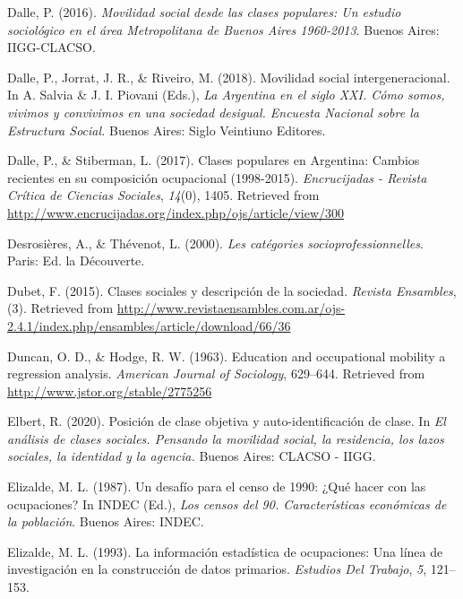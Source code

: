 \documentclass[
]{article}
\newlength{\cslhangindent}
\newlength{\cslentryspacingunit} %
\newenvironment{CSLReferences}[2] %
 {%
  \setlength{\parindent}{0pt}
  \ifodd #1
  \let\oldpar\par
  \def\par{\hangindent=\cslhangindent\oldpar}
  \fi
  \setlength{\parskip}{#2\cslentryspacingunit}
 }%
 {}
\begin{document}
\begin{CSLReferences}{1}{0}
\leavevmode{}%
Dalle, P. (2016). \emph{Movilidad social desde las clases populares: Un estudio sociológico en el área {Metropolitana} de {Buenos} {Aires} 1960-2013}. Buenos Aires: IIGG-CLACSO.

\leavevmode{}%
Dalle, P., Jorrat, J. R., \& Riveiro, M. (2018). Movilidad social intergeneracional. In A. Salvia \& J. I. Piovani (Eds.), \emph{La {Argentina} en el siglo {XXI}. {Cómo} somos, vivimos y convivimos en una sociedad desigual. {Encuesta} {Nacional} sobre la {Estructura} {Social}.} Buenos Aires: Siglo Veintiuno Editores.

\leavevmode{}%
Dalle, P., \& Stiberman, L. (2017). Clases populares en {Argentina}: Cambios recientes en su composición ocupacional (1998-2015). \emph{Encrucijadas - Revista Crítica de Ciencias Sociales}, \emph{14}(0), 1405. Retrieved from \url{http://www.encrucijadas.org/index.php/ojs/article/view/300}

\leavevmode{}%
Desrosières, A., \& Thévenot, L. (2000). \emph{Les catégories socioprofessionnelles}. Paris: Ed. la Découverte.

\leavevmode{}%
Dubet, F. (2015). Clases sociales y descripción de la sociedad. \emph{Revista Ensambles}, (3). Retrieved from \url{http://www.revistaensambles.com.ar/ojs-2.4.1/index.php/ensambles/article/download/66/36}

\leavevmode{}%
Duncan, O. D., \& Hodge, R. W. (1963). Education and occupational mobility a regression analysis. \emph{American Journal of Sociology}, 629--644. Retrieved from \url{http://www.jstor.org/stable/2775256}

\leavevmode{}%
Elbert, R. (2020). Posición de clase objetiva y auto-identificación de clase. In \emph{El análisis de clases sociales. {Pensando} la movilidad social, la residencia, los lazos sociales, la identidad y la agencia.} Buenos Aires: CLACSO - IIGG.

\leavevmode{}%
Elizalde, M. L. (1987). Un desafío para el censo de 1990: ¿Qué hacer con las ocupaciones? In INDEC (Ed.), \emph{Los censos del 90. {Características} económicas de la población}. Buenos Aires: INDEC.

\leavevmode{}%
Elizalde, M. L. (1993). La información estadística de ocupaciones: {Una} línea de investigación en la construcción de datos primarios. \emph{Estudios Del Trabajo}, \emph{5}, 121--153.


\end{CSLReferences}
\end{document}
